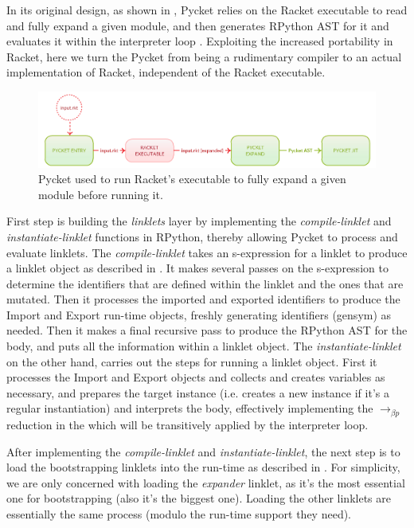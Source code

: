 In its original design, as shown in , Pycket
relies on the Racket executable to read and fully expand a given
module\cite{samth:11}, and then generates RPython AST for it and
evaluates it within the interpreter loop \cite{pycket15}. Exploiting
the increased portability in Racket, here we turn the Pycket from
being a rudimentary compiler to an actual implementation of Racket,
independent of the Racket executable.

\begin{figure}[h!]
  \centering \includegraphics[scale=0.3]{img/old-pycket-2}
\caption{Pycket used to run Racket's executable to fully expand a given module before running it.}
\label{fig:old-pycket}
\end{figure}

First step is building the \emph{linklets} layer by implementing the
\emph{compile-linklet} and \emph{instantiate-linklet} functions in
RPython, thereby allowing Pycket to process and evaluate linklets. The
\emph{compile-linklet} takes an s-expression for a linklet to produce
a linklet object as described in
. It makes several passes on the
s-expression to determine the identifiers that are defined within the
linklet and the ones that are mutated. Then it processes the imported
and exported identifiers to produce the Import and Export run-time
objects, freshly generating identifiers (gensym) as needed. Then it
makes a final recursive pass to produce the RPython AST for the body,
and puts all the information within a linklet object. The
\emph{instantiate-linklet} on the other hand, carries out the steps
for running a linklet object. First it processes the Import and Export
objects and collects and creates variables as necessary, and prepares
the target instance (i.e. creates a new instance if it's a regular
instantiation) and interprets the body, effectively implementing the
$\longrightarrow_{\beta p}$ reduction in the  which will be
transitively applied by the interpreter loop.

After implementing the \emph{compile-linklet} and
\emph{instantiate-linklet}, the next step is to load the bootstrapping
linklets into the run-time as described in
. For simplicity, we are only concerned
with loading the \emph{expander} linklet, as it's the most essential
one for bootstrapping (also it's the biggest one). Loading the other
linklets are essentially the same process (modulo the run-time support
they need).

